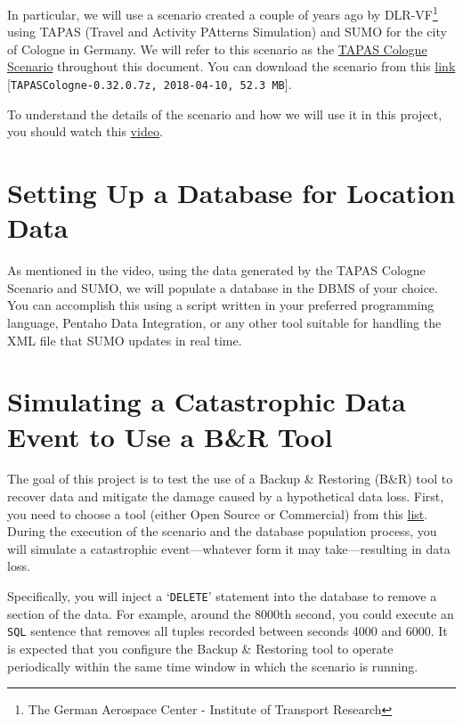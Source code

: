 \documentclass{article}
\begin{document}
In particular, we will use a scenario created a couple of years ago by DLR-VF\footnote{The German Aerospace Center - Institute of Transport Research} using TAPAS (Travel and Activity PAtterns Simulation) and SUMO for the city of Cologne in Germany. We will refer to this scenario as the \href{https://sumo.dlr.de/docs/Data/Scenarios/TAPASCologne.html}{TAPAS Cologne Scenario} throughout this document. You can download the scenario from this \href{https://sourceforge.net/projects/sumo/files/traffic_data/scenarios/TAPASCologne/}{link} [\texttt{TAPASCologne-0.32.0.7z, 2018-04-10, 52.3 MB}].

To understand the details of the scenario and how we will use it in this project, you should watch this \href{https://youtu.be/TOL0fdff3fI}{video}.

\section{Setting Up a Database for Location Data}
As mentioned in the video, using the data generated by the TAPAS Cologne Scenario and SUMO, we will populate a database in the DBMS of your choice. You can accomplish this using a script written in your preferred programming language, Pentaho Data Integration, or any other tool suitable for handling the XML file that SUMO updates in real time.

\section{Simulating a Catastrophic Data Event to Use a B\&R Tool}
The goal of this project is to test the use of a Backup \& Restoring (B\&R) tool to recover data and mitigate the damage caused by a hypothetical data loss. First, you need to choose a tool (either Open Source or Commercial) from this \href{https://drive.google.com/file/d/1lBAwSaCl7CrQvhk40qKYRYrDy5rKABt9/view?usp=sharing}{list}. During the execution of the scenario and the database population process, you will simulate a catastrophic event—whatever form it may take—resulting in data loss.

Specifically, you will inject a `\texttt{DELETE}' statement into the database to remove a section of the data. For example, around the 8000th second, you could execute an \texttt{SQL} sentence that removes all tuples recorded between seconds 4000 and 6000. It is expected that you configure the Backup \& Restoring tool to operate periodically within the same time window in which the scenario is running.
\end{document}
